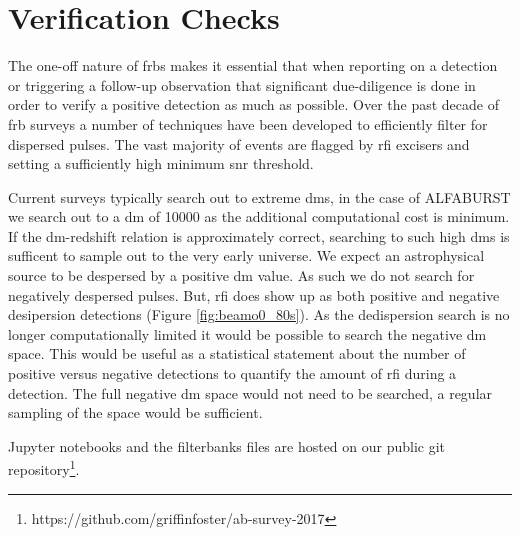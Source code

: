 \documentclass[a4paper,fleqn,usenatbib]{mnras}
\begin{document}
\section{Verification Checks}

The one-off nature of \glspl{frb} makes it essential that when reporting on a
detection or triggering a follow-up observation that significant due-diligence
is done in order to verify a positive detection as much as possible. Over the
past decade of \gls{frb} surveys a number of techniques have been developed to
efficiently filter for dispersed pulses. The vast majority of events are flagged
by \gls{rfi} excisers and setting a sufficiently high minimum \gls{snr}
threshold. 


Current surveys typically search out to extreme \glspl{dm}, in the case of
ALFABURST we search out to a \gls{dm} of 10000 as the additional computational
cost is minimum. If the \gls{dm}-redshift relation is approximately correct,
searching to such high \glspl{dm} is sufficent to sample out to the very early
universe. We expect an astrophysical source to be despersed by a positive
\gls{dm} value. As such we do not search for negatively despersed pulses. But,
\gls{rfi} does show up as both positive and negative desipersion detections
(Figure \ref{fig:beamo0_80s}). As the dedispersion search is no longer
computationally limited it would be possible to search the negative \gls{dm}
space. This would be useful as a statistical statement about the number of
positive versus negative detections to quantify the amount of \gls{rfi} during a
detection. The full negative \gls{dm} space would not need to be searched, a
regular sampling of the space would be sufficient.





Jupyter notebooks and the filterbanks files are hosted on our
public git repository\footnote{https://github.com/griffinfoster/ab-survey-2017}.


 

\bsp	%
\label{lastpage}
\end{document}
